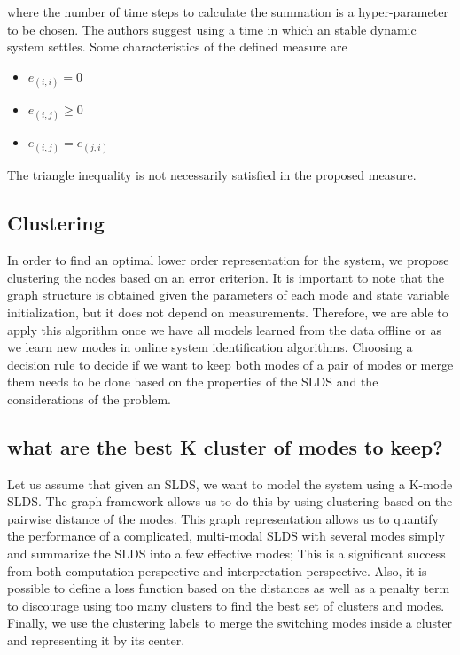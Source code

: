 \documentclass[journal]{IEEEtran}
\begin{document}
 where the number of time steps to calculate the summation is a hyper-parameter to be chosen. The authors suggest using a time in which an stable dynamic system settles. Some characteristics of the defined measure are
\begin{itemize}
    \item $e_{(i,i)}=0$
    \item $e_{(i,j)}\geq0$
    \item $e_{(i,j)}=e_{(j,i)}$
\end{itemize}

The triangle inequality is not necessarily satisfied in the proposed measure.
\subsection{Clustering}
In order to find an optimal lower order representation for the system, we propose clustering the nodes based on an error criterion. It is important to note that the graph structure is obtained given the parameters of each mode and state variable initialization, but it does not depend on measurements. Therefore, we are able to apply this algorithm once we have all models learned from the data offline or as we learn new modes in online system identification algorithms. 
Choosing a decision rule to decide if we want to keep both modes of a pair of modes or merge them needs to be done based on the properties of the SLDS and the considerations of the problem. 

\subsection{what are the best K cluster of modes to keep?}

Let us assume that given an SLDS, we want to model the system using a K-mode SLDS. The graph framework allows us to do this by using clustering based on the pairwise distance of the modes. This graph representation allows us to quantify the performance of a complicated, multi-modal SLDS with several modes simply and summarize the SLDS into a few effective modes; This is a significant success from both computation perspective and interpretation perspective. Also, it is possible to define a loss function based on the distances as well as a penalty term to discourage using too many clusters to find the best set of clusters and modes. Finally, we use the clustering labels to merge the switching modes inside a cluster and representing it by its center. 
\end{document}
